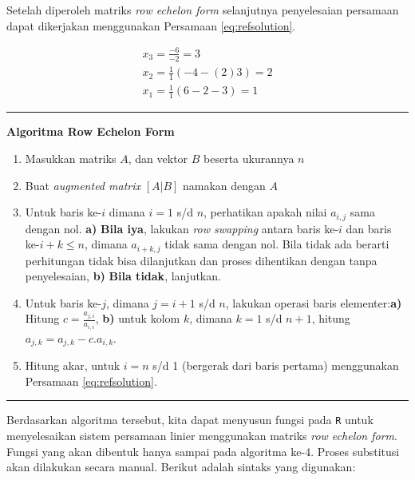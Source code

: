 \documentclass[
]{book}
\providecommand{\tightlist}{%
  \setlength{\itemsep}{0pt}\setlength{\parskip}{0pt}}
\theoremstyle{definition}
\theoremstyle{definition}
\theoremstyle{definition}
\theoremstyle{definition}
\theoremstyle{remark}
\begin{document}
Setelah diperoleh matriks \emph{row echelon form} selanjutnya penyelesaian persamaan dapat dikerjakan menggunakan Persamaan \eqref{eq:refsolution}.

\begin{equation*}
\begin{matrix}
  x_3=\frac{-6}{-2}=3 \\
  x_2=\frac{1}{1}\left(-4-\left(2\right)3\right)=2 \\
  x_1=\frac{1}{1}\left(6-2-3\right)=1
\end{matrix}
\end{equation*}

\begin{center}\rule{0.5\linewidth}{0.5pt}\end{center}

\textbf{Algoritma Row Echelon Form}

\begin{enumerate}
\def\labelenumi{\arabic{enumi}.}
\tightlist
\item
  Masukkan matriks \(A\), dan vektor \(B\) beserta ukurannya \(n\)
\item
  Buat \emph{augmented matrix} \(\left[A|B\right]\) namakan dengan \(A\)
\item
  Untuk baris ke-\(i\) dimana \(i=1\) s/d \(n\), perhatikan apakah nilai \(a_{i,j}\) sama dengan nol. \textbf{a)} \textbf{Bila iya}, lakukan \emph{row swapping} antara baris ke-\(i\) dan baris ke-\(i+k\leq n\), dimana \(a_{i+k,j}\) tidak sama dengan nol. Bila tidak ada berarti perhitungan tidak bisa dilanjutkan dan proses dihentikan dengan tanpa penyelesaian, \textbf{b)} \textbf{Bila tidak}, lanjutkan.
\item
  Untuk baris ke-\(j\), dimana \(j=i+1\) s/d \(n\), lakukan operasi baris elementer:\textbf{a)} Hitung \(c=\frac{a_{j,i}}{a_{i,i}}\), \textbf{b)} untuk kolom \(k\), dimana \(k=1\) s/d \(n+1\), hitung \(a_{j,k}=a_{j,k}-c.a_{i,k}\).
\item
  Hitung akar, untuk \(i=n\) s/d 1 (bergerak dari baris pertama) menggunakan Persamaan \eqref{eq:refsolution}.
\end{enumerate}

\begin{center}\rule{0.5\linewidth}{0.5pt}\end{center}

Berdasarkan algoritma tersebut, kita dapat menyusun fungsi pada \texttt{R} untuk menyelesaikan sistem persamaan linier menggunakan matriks \emph{row echelon form}. Fungsi yang akan dibentuk hanya sampai pada algoritma ke-4. Proses substitusi akan dilakukan secara manual. Berikut adalah sintaks yang digunakan:
\end{document}
